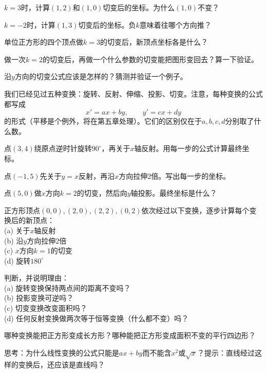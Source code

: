 \begin{exercise}
\item $k=3$时，计算$(1,2)$和$(1,0)$切变后的坐标。为什么$(1,0)$不变？
\item $k=-2$时，计算$(1,3)$切变后的坐标。负$k$意味着往哪个方向推？
\item 单位正方形的四个顶点做$k=3$的切变后，新顶点坐标各是什么？
\item 做一次$k=2$的切变后，再做一个什么参数的切变能把图形变回去？算一下验证。
\item 沿$y$方向的切变公式应该是怎样的？猜测并验证一个例子。
\end{exercise}


我们已经见过五种变换：旋转、反射、伸缩、投影、切变。注意，每种变换的公式都写成
\[
x' = ax + by,\qquad y' = cx + dy
\]
的形式（平移是个例外，将在第五章处理）。它们的区别仅在于$a,b,c,d$分别取了什么数。

\begin{exercise}
\item 点$(3,4)$绕原点逆时针旋转$90^\circ$，再关于$x$轴反射。用每一步的公式计算最终坐标。
\item 点$(-1,5)$先关于$y=x$反射，再沿$x$方向拉伸$2$倍。写出每一步的坐标。
\item 点$(5,0)$做$x$方向$k=2$的切变，然后向$y$轴投影。最终坐标是什么？
\item 正方形顶点$(0,0),(2,0),(2,2),(0,2)$依次经过以下变换，逐步计算每个变换后的新顶点：\\
(a) 关于$x$轴反射\\
(b) 沿$y$方向拉伸$2$倍\\
(c) $x$方向$k=1$的切变\\
(d) 旋转$180^\circ$
\item 判断，并说明理由：\\
(a) 旋转变换保持两点间的距离不变吗？\\
(b) 投影变换可逆吗？\\
(c) 切变变换改变面积吗？\\
(d) 任何反射变换做两次等于恒等变换（什么都不变）吗？
\item 哪种变换能把正方形变成长方形？哪种能把正方形变成面积不变的平行四边形？
\item 思考：为什么线性变换的公式只能是$ax+by$而不能含$x^2$或$\sqrt{x}$？提示：直线经过这样的变换后，还应该是直线吗？
\end{exercise}


